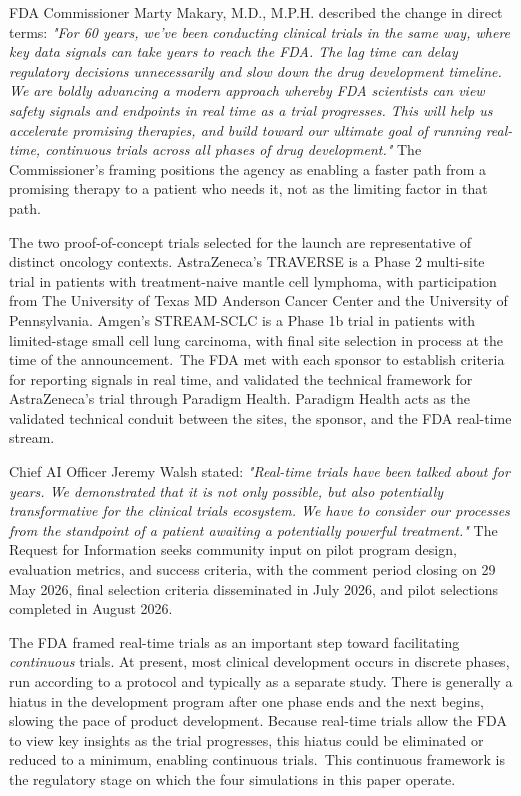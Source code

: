 \documentclass[11pt]{article}
\begin{document}
FDA Commissioner Marty Makary, M.D., M.P.H. described the change in
direct terms: \emph{"For 60 years, we've been conducting clinical trials
in the same way, where key data signals can take years to reach the
FDA. The lag time can delay regulatory decisions unnecessarily and slow
down the drug development timeline. We are boldly advancing a modern
approach whereby FDA scientists can view safety signals and endpoints
in real time as a trial progresses. This will help us accelerate
promising therapies, and build toward our ultimate goal of running
real-time, continuous trials across all phases of drug development."}
The Commissioner's framing positions the agency as enabling a faster
path from a promising therapy to a patient who needs it, not as the
limiting factor in that path.

The two proof-of-concept trials selected for the launch are
representative of distinct oncology contexts. AstraZeneca's TRAVERSE
is a Phase 2 multi-site trial in patients with treatment-naive mantle
cell lymphoma, with participation from The University of Texas MD
Anderson Cancer Center and the University of Pennsylvania. Amgen's
STREAM-SCLC is a Phase 1b trial in patients with limited-stage small
cell lung carcinoma, with final site selection in process at the time
of the announcement.\ The FDA met with each sponsor to establish
criteria for reporting signals in real time, and validated the
technical framework for AstraZeneca's trial through Paradigm Health.
Paradigm Health acts as the validated technical conduit between the
sites, the sponsor, and the FDA real-time stream.

Chief AI Officer Jeremy Walsh stated: \emph{"Real-time trials have been
talked about for years. We demonstrated that it is not only possible,
but also potentially transformative for the clinical trials ecosystem.
We have to consider our processes from the standpoint of a patient
awaiting a potentially powerful treatment."} The Request for
Information seeks community input on pilot program design, evaluation
metrics, and success criteria, with the comment period closing on 29
May 2026, final selection criteria disseminated in July 2026, and
pilot selections completed in August 2026.

The FDA framed real-time trials as an important step toward facilitating
\emph{continuous} trials. At present, most clinical development occurs
in discrete phases, run according to a protocol and typically as a
separate study. There is generally a hiatus in the development program
after one phase ends and the next begins, slowing the pace of product
development. Because real-time trials allow the FDA to view key
insights as the trial progresses, this hiatus could be eliminated or
reduced to a minimum, enabling continuous trials.\ This continuous
framework is the regulatory stage on which the four simulations in
this paper operate.
\end{document}
